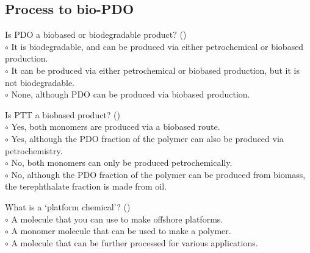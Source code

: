 \documentclass[]{beamer}
\begin{document}
\begin{CJK}{UTF8}{gbsn}
\subsection{Process to bio-PDO}
\setcounter{questions}{0}


\begin{frame}[shrink] {} 
\addtocounter{questions}{1}
\color{blue}
  Is PDO a biobased or biodegradable product?
 ({})\\
\color{black}
\setlength{\parindent}{-0.4cm}
{\color{red}$\circ$}  It is biodegradable, and can be produced via either petrochemical or biobased production.  \\
{\color{red}$\circ$} It can be produced via either petrochemical or biobased production, but it is not biodegradable.   \\
{\color{red}$\circ$} None, although PDO can be produced via biobased production.  \\
\end{frame}


\begin{frame}[shrink] {} 
\addtocounter{questions}{1}
\color{blue}
  Is PTT a biobased product?
 ({})\\
\color{black}
\setlength{\parindent}{-0.4cm}
{\color{red}$\circ$} Yes, both monomers are produced via a biobased route.  \\
{\color{red}$\circ$} Yes, although the PDO fraction of the polymer can also be produced via petrochemistry.   \\
{\color{red}$\circ$} No, both monomers can only be produced petrochemically.   \\
{\color{red}$\circ$}  No, although the PDO fraction of the polymer can be produced from biomass, the terephthalate fraction is made from oil.   \\
\end{frame}


\begin{frame}[shrink] {} 
\addtocounter{questions}{1}
\color{blue}
  What is a ‘platform chemical’?
 ({})\\
\color{black}
\setlength{\parindent}{-0.4cm}
{\color{red}$\circ$} A molecule that you can use to make offshore platforms.  \\
{\color{red}$\circ$} A monomer molecule that can be used to make a polymer.   \\
{\color{red}$\circ$}  A molecule that can be further processed for various applications.  \\
\end{frame}



\end{CJK}
\end{document}
